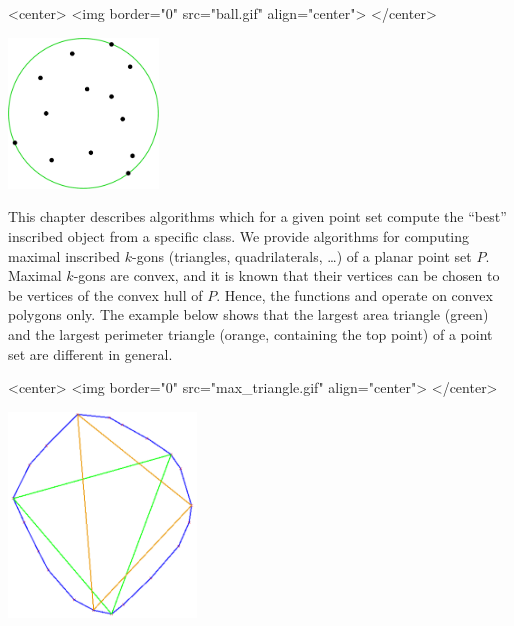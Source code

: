 

\begin{ccHtmlOnly}
<center>
<img border="0" src="ball.gif" align="center">
</center>
\end{ccHtmlOnly} 

\begin{ccTexOnly}
\begin{center}
\includegraphics[width=4cm]{Optimisation/ball}
\end{center}
\end{ccTexOnly}

This chapter describes algorithms which for a given point set compute
the ``best'' inscribed object from a specific
class. We provide algorithms for
computing maximal inscribed $k$-gons (triangles, quadrilaterals,
\dots) of a planar point set $P$. Maximal $k$-gons are convex, and it
is known that their vertices can be chosen to be vertices of the
convex hull of $P$. Hence, the functions
 and
 operate on convex polygons
only. The example below shows that the largest area triangle (green)
and the largest perimeter triangle (orange, containing the top point)
of a point set are different in general.

\begin{ccHtmlOnly}
<center>
<img border="0" src="max_triangle.gif" align="center">
</center>
\end{ccHtmlOnly} 

\begin{ccTexOnly}
\begin{center}
\includegraphics[width=5cm]{Optimisation/max_triangle}
\end{center}
\end{ccTexOnly}


